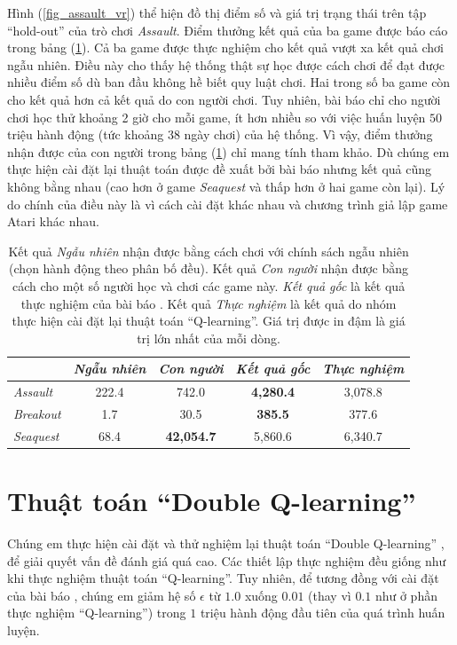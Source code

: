 	Hình (\ref{fig_assault_vr}) thể hiện đồ thị điểm số và giá trị trạng thái trên tập ``hold-out'' của trò chơi \textit{Assault}.
	Điểm thưởng kết quả của ba game được báo cáo trong bảng (\ref{table_dqn_results}).
	Cả ba game được thực nghiệm cho kết quả vượt xa kết quả chơi ngẫu nhiên.
	Điều này cho thấy hệ thống thật sự học được cách chơi để đạt được nhiều điểm số dù ban đầu không hề biết quy luật chơi.
	Hai trong số ba game còn cho kết quả hơn cả kết quả do con người chơi.
	Tuy nhiên, bài báo \cite{mnihdqn2015} chỉ cho người chơi học thử khoảng 2 giờ cho mỗi game, ít hơn nhiều so với việc huấn luyện $50$ triệu hành động (tức khoảng 38 ngày chơi) của hệ thống.
	Vì vậy, điểm thưởng nhận được của con người trong bảng (\ref{table_dqn_results}) chỉ mang tính tham khảo.
	Dù chúng em thực hiện cài đặt lại thuật toán được đề xuất bởi bài báo \cite{mnihdqn2015} nhưng kết quả cũng không bằng nhau (cao hơn ở game \textit{Seaquest} và thấp hơn ở hai game còn lại).
	Lý do chính của điều này là vì cách cài đặt khác nhau và chương trình giả lập game Atari khác nhau.
	
	\begin{table}
		\centering
		\caption[Điểm thưởng nhận được của thuật toán ``Q-learning'']{
		Kết quả \textit{Ngẫu nhiên} nhận được bằng cách chơi với chính sách ngẫu nhiên (chọn hành động theo phân bố đều).
		Kết quả \textit{Con người} nhận được bằng cách cho một số người học và chơi các game này.
		\textit{Kết quả gốc} là kết quả thực nghiệm của bài báo \cite{mnihdqn2015}.
		Kết quả \textit{Thực nghiệm} là kết quả do nhóm thực hiện cài đặt lại thuật toán ``Q-learning''.
		Giá trị được in đậm là giá trị lớn nhất của mỗi dòng.}
		\label{table_dqn_results}
		\begin{tabular}{| l | c | c | c | c |}
			\hline
			 & \textit{Ngẫu nhiên}\cite{mnihdqn2015} & \textit{Con người}\cite{mnihdqn2015} & \textit{Kết quả gốc}\cite{mnihdqn2015} & \textit{Thực nghiệm} \\
			\hline \hline
			\textit{Assault} & 222.4 & 742.0 & \textbf{4,280.4} & 3,078.8 \\ 
			\hline
			\textit{Breakout} & 1.7 & 30.5 & \textbf{385.5} & 377.6 \\ 
			\hline
			\textit{Seaquest} & 68.4 & \textbf{42,054.7} & 5,860.6 & 6,340.7 \\ 
			\hline
		\end{tabular}		
	\end{table}

\section{Thuật toán ``Double Q-learning''}
	Chúng em thực hiện cài đặt và thử nghiệm lại thuật toán ``Double Q-learning'' \cite{hasselt2010double}, \cite{van2015deep} để giải quyết vấn đề đánh giá quá cao.
	Các thiết lập thực nghiệm đều giống như khi thực nghiệm thuật toán ``Q-learning''.
	Tuy nhiên, để tương đồng với cài đặt của bài báo \cite{van2015deep}, chúng em giảm hệ số $\epsilon$ từ $1.0$ xuống $0.01$ (thay vì $0.1$ như ở phần thực nghiệm ``Q-learning'') trong $1$ triệu hành động đầu tiên của quá trình huấn luyện.
	
